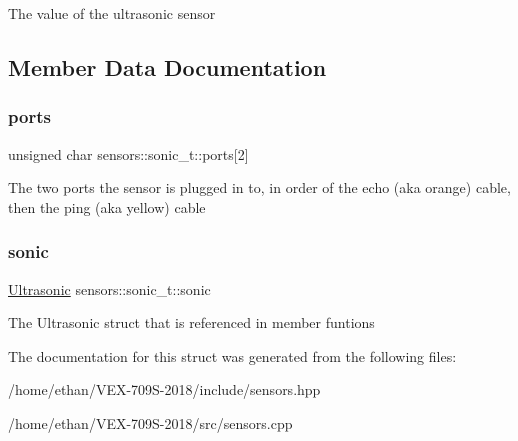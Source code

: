 The value of the ultrasonic sensor 

\subsection{Member Data Documentation}
\mbox{\label{structsensors_1_1sonic__t_a64b68ab2ff696f95714dad492ea30939}} 
\subsubsection{\texorpdfstring{ports}{ports}}
{\footnotesize\ttfamily unsigned char sensors\+::sonic\+\_\+t\+::ports\mbox{[}2\mbox{]}}

The two ports the sensor is plugged in to, in order of the echo (aka orange) cable, then the ping (aka yellow) cable \mbox{\label{structsensors_1_1sonic__t_ac84ca5638a8dc7156d90937eb228ed18}} 
\subsubsection{\texorpdfstring{sonic}{sonic}}
{\footnotesize\ttfamily \hyperlink{API_8h_a527ee5b64142c3505d6931d8ed7ac6b7}{Ultrasonic} sensors\+::sonic\+\_\+t\+::sonic}

The Ultrasonic struct that is referenced in member funtions 

The documentation for this struct was generated from the following files\+:\begin{DoxyCompactItemize}
\item 
/home/ethan/\+V\+E\+X-\/709\+S-\/2018/include/sensors.\+hpp\item 
/home/ethan/\+V\+E\+X-\/709\+S-\/2018/src/sensors.\+cpp\end{DoxyCompactItemize}
